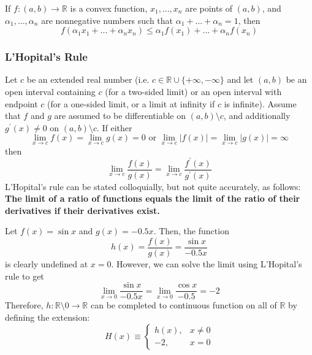   \begin{proposition}
  If $f: (a, b) \longrightarrow \mathbb{R}$ is a convex function, $x_1, ..., x_n$ are points of $(a, b)$, and $\alpha_1, ..., \alpha_n$ are nonnegative numbers such that $\alpha_1 + ... + \alpha_n = 1$, then 
  \[f(\alpha_1 x_1 + ... + \alpha_n x_n) \leq \alpha_1 f(x_1) + ... + \alpha_n f(x_n)\]
  \end{proposition}

  \subsubsection{L'Hopital's Rule}

  \begin{theorem}
    Let $c$ be an extended real number (i.e. $c \in \mathbb{R} \cup \{+\infty, -\infty\}$ and let $(a, b)$ be an open interval containing $c$ (for a two-sided limit) or an open interval with endpoint $c$ (for a one-sided limit, or a limit at infinity if $c$ is infinite). Assume that $f$ and $g$ are assumed to be differentiable on $(a, b) \setminus c$, and additionally $g^\prime (x) \neq 0$ on $(a, b) \setminus c$. If either 
    \begin{equation}
      \lim_{x \rightarrow c} f(x) = \lim_{x \rightarrow c} g(x) = 0 \text{ or } \lim_{x \rightarrow c} |f(x)| = \lim_{x \rightarrow c} |g(x)| = \infty
    \end{equation}
    then 
    \begin{equation}
      \lim_{x \rightarrow c} \frac{f(x)}{g(x)} = \lim_{x \rightarrow c} \frac{f^\prime (x)}{g^\prime (x)}
    \end{equation}
    L'Hopital's rule can be stated colloquially, but not quite accurately, as follows: \textbf{The limit of a ratio of functions equals the limit of the ratio of their derivatives if their derivatives exist.}
  \end{theorem}

  \begin{example}
    Let $f(x) = \sin{x}$ and $g(x) = -0.5x$. Then, the function 
    \begin{equation}
      h(x) = \frac{f(x)}{g(x)} = \frac{\sin{x}}{-0.5x}
    \end{equation}
    is clearly undefined at $x = 0$. 
    However, we can solve the limit using L'Hopital's rule to get
    \begin{equation}
      \lim_{x \rightarrow 0} \frac{\sin{x}}{-0.5x} = \lim_{x \rightarrow 0} \frac{\cos{x}}{-0.5} = -2
    \end{equation}
    Therefore, $h: \mathbb{R} \setminus 0 \longrightarrow \mathbb{R}$ can be completed to continuous function on all of $\mathbb{R}$ by defining the extension: 
    \begin{equation}
      H(x) \equiv \begin{cases} h(x), & x \neq 0 \\ -2, & x = 0 \end{cases} 
    \end{equation}
  \end{example}


